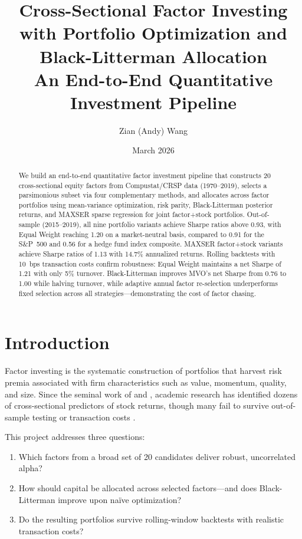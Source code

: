 \documentclass[12pt,a4paper]{article}
\title{%
    \textbf{Cross-Sectional Factor Investing with Portfolio Optimization and Black-Litterman Allocation} \\[0.5em]
    \large An End-to-End Quantitative Investment Pipeline
}
\author{Zian (Andy) Wang}
\date{March 2026}
\begin{document}
\maketitle

\begin{abstract}
We build an end-to-end quantitative factor investment pipeline that constructs 20 cross-sectional equity factors from Compustat/CRSP data (1970--2019), selects a parsimonious subset via four complementary methods, and allocates across factor portfolios using mean-variance optimization, risk parity, Black-Litterman posterior returns, and MAXSER sparse regression for joint factor+stock portfolios. Out-of-sample (2015--2019), all nine portfolio variants achieve Sharpe ratios above 0.93, with Equal Weight reaching 1.20 on a market-neutral basis, compared to 0.91 for the S\&P~500 and 0.56 for a hedge fund index composite. MAXSER factor+stock variants achieve Sharpe ratios of 1.13 with 14.7\% annualized returns. Rolling backtests with 10~bps transaction costs confirm robustness: Equal Weight maintains a net Sharpe of 1.21 with only 5\% turnover. Black-Litterman improves MVO's net Sharpe from 0.76 to 1.00 while halving turnover, while adaptive annual factor re-selection underperforms fixed selection across all strategies---demonstrating the cost of factor chasing.
\end{abstract}

\tableofcontents
\newpage

\section{Introduction}

Factor investing is the systematic construction of portfolios that harvest risk premia associated with firm characteristics such as value, momentum, quality, and size. Since the seminal work of \citet{fama1993common} and \citet{carhart1997persistence}, academic research has identified dozens of cross-sectional predictors of stock returns, though many fail to survive out-of-sample testing or transaction costs \citep{harvey2016and,hou2020replicating}.

This project addresses three questions:
\begin{enumerate}[noitemsep]
    \item Which factors from a broad set of 20 candidates deliver robust, uncorrelated alpha?
    \item How should capital be allocated across selected factors---and does Black-Litterman improve upon na\"ive optimization?
    \item Do the resulting portfolios survive rolling-window backtests with realistic transaction costs?
\end{enumerate}
\end{document}
